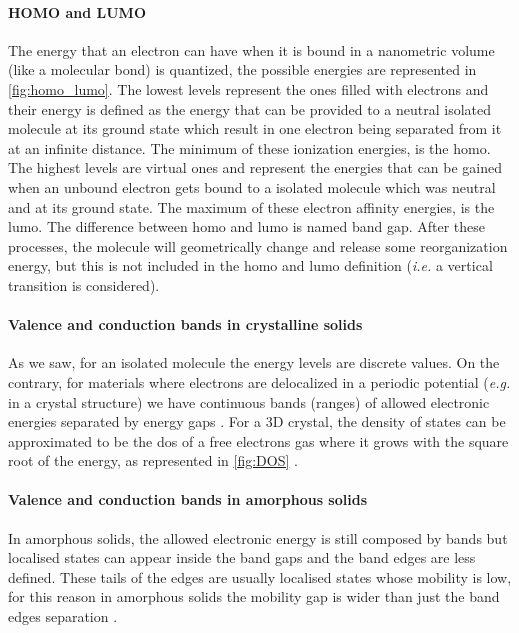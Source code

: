 		\paragraph{HOMO and LUMO}
		The energy that an electron can have when it is bound in a nanometric volume (like a molecular bond) is quantized, the possible energies are represented in \cref{fig:homo_lumo}.
		The lowest levels represent the ones filled with electrons and their energy is defined as the energy that can be provided to a neutral isolated molecule at its ground state which result in one electron being separated from it at an infinite distance.
		The minimum of these ionization energies, is the \gls{homo}.
		The highest levels are virtual ones and represent the energies that can be gained when an unbound electron gets bound to a isolated molecule which was neutral and at its ground state.
		The maximum of these electron affinity energies, is the \gls{lumo}.
		The difference between \gls{homo} and \gls{lumo} is named band gap.
		After these processes, the molecule will geometrically change and release some reorganization energy, but this is not included in the \gls{homo} and \gls{lumo} definition (\textsl{i.e.} a vertical transition is considered).

		\paragraph{Valence and conduction bands in crystalline solids}
		As we saw, for an isolated molecule the energy levels are discrete values.
		On the contrary, for materials where electrons are delocalized in a periodic potential (\textsl{e.g.} in a crystal structure) we have continuous bands (ranges) of allowed electronic energies separated by energy gaps \cite{WikipediaPeriodic}.
		For a 3D crystal, the density of states can be approximated to be the \gls{dos} of a free electrons gas where it grows with the square root of the energy, as represented in \cref{fig:DOS} \cite[140]{Kittel2004}.
		
		\paragraph{Valence and conduction bands in amorphous solids}
		In amorphous solids, the allowed electronic energy is still composed by bands but localised states can appear inside the band gaps and the band edges are less defined.
		These tails of the edges are usually localised states whose mobility is low, for this reason in amorphous solids the mobility gap is wider than just the band edges separation \cite[213]{Stenzel2005}.
		

